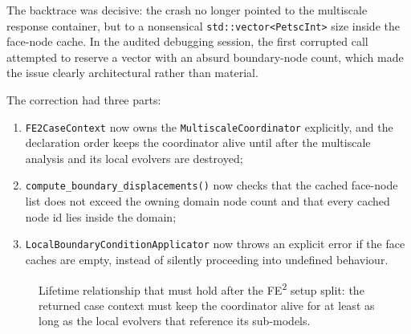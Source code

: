 The backtrace was decisive: the crash no longer pointed to the multiscale
response container, but to a nonsensical
\texttt{std::vector<PetscInt>} size inside the face-node cache.  In the audited
debugging session, the first corrupted call attempted to reserve a vector with
an absurd boundary-node count, which made the issue clearly architectural
rather than material.

The correction had three parts:
\begin{enumerate}
  \item \texttt{FE2CaseContext} now owns the
    \texttt{MultiscaleCoordinator} explicitly, and the declaration order keeps
    the coordinator alive until after the multiscale analysis and its local
    evolvers are destroyed;
  \item \texttt{compute\_boundary\_displacements()} now checks that the cached
    face-node list does not exceed the owning domain node count and that every
    cached node id lies inside the domain;
  \item \texttt{LocalBoundaryConditionApplicator} now throws an explicit error
    if the face caches are empty, instead of silently proceeding into undefined
    behaviour.
\end{enumerate}

\begin{figure}[htbp]
\centering
{}
\caption{Lifetime relationship that must hold after the FE\textsuperscript{2}
setup split: the returned case context must keep the coordinator alive for at
least as long as the local evolvers that reference its sub-models.}
\label{fig:fe2-coordinator-lifetime}
\end{figure}

